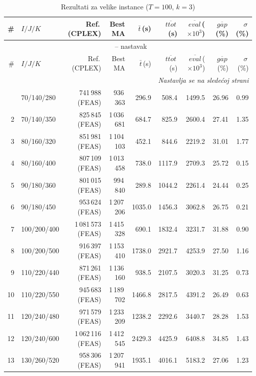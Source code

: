 \documentclass[12pt,a4paper]{article}
\begin{document}
\begin{longtable}{r l r r r r r r r}
\caption{Rezultati za velike instance ($T=100$, $k=3$)} \\
\toprule
\# & $I/J/K$ & Ref.\,(CPLEX) & Best MA & $\bar t$\,(s) & $\overline{ttot}$\,(s) & $\overline{eval}$\,($\times 10^3$) & $\overline{gap}$\,(\%) & $\sigma$\,(\%) \\
\midrule
\endfirsthead
\multicolumn{9}{c}{\tablename\ \thetable{} -- nastavak} \\
\toprule
\# & $I/J/K$ & Ref.\,(CPLEX) & Best MA & $\bar t$\,(s) & $\overline{ttot}$\,(s) & $\overline{eval}$\,($\times 10^3$) & $\overline{gap}$\,(\%) & $\sigma$\,(\%) \\
\midrule
\endhead
\midrule
\multicolumn{9}{r}{\textit{Nastavlja se na sledećoj strani}} \\
\endfoot
\bottomrule
\endlastfoot
1 & 70/140/280 & 741\,988 (FEAS) & 936\,363 & 296.9 & 508.4 & 1499.5 & 26.96 & 0.99 \\
2 & 70/140/350 & 825\,845 (FEAS) & 1\,036\,681 & 684.7 & 825.9 & 2600.4 & 27.41 & 1.35 \\
3 & 80/160/320 & 851\,981 (FEAS) & 1\,104\,103 & 452.1 & 844.6 & 2219.2 & 31.01 & 1.77 \\
4 & 80/160/400 & 807\,109 (FEAS) & 1\,013\,458 & 738.0 & 1117.9 & 2709.3 & 25.72 & 0.15 \\
5 & 90/180/360 & 801\,015 (FEAS) & 994\,840 & 289.8 & 1044.2 & 2261.4 & 24.44 & 0.25 \\
6 & 90/180/450 & 953\,624 (FEAS) & 1\,207\,206 & 1035.0 & 1456.3 & 3062.8 & 26.75 & 0.21 \\
7 & 100/200/400 & 1\,081\,573 (FEAS) & 1\,415\,328 & 690.1 & 1832.4 & 3231.7 & 31.88 & 0.90 \\
8 & 100/200/500 & 916\,397 (FEAS) & 1\,153\,410 & 1738.0 & 2921.7 & 4253.9 & 27.50 & 1.16 \\
9 & 110/220/440 & 871\,261 (FEAS) & 1\,136\,160 & 938.5 & 2107.5 & 3020.3 & 31.25 & 0.73 \\
10 & 110/220/550 & 945\,683 (FEAS) & 1\,189\,702 & 1466.8 & 2817.5 & 4391.2 & 26.49 & 0.63 \\
11 & 120/240/480 & 971\,579 (FEAS) & 1\,233\,209 & 1238.2 & 2292.6 & 3440.7 & 28.28 & 1.53 \\
12 & 120/240/600 & 1\,062\,116 (FEAS) & 1\,412\,545 & 2429.3 & 4425.9 & 6408.8 & 34.85 & 1.43 \\
13 & 130/260/520 & 958\,306 (FEAS) & 1\,207\,941 & 1935.1 & 4016.1 & 5183.2 & 27.06 & 1.23 \\

\end{longtable}
\end{document}
